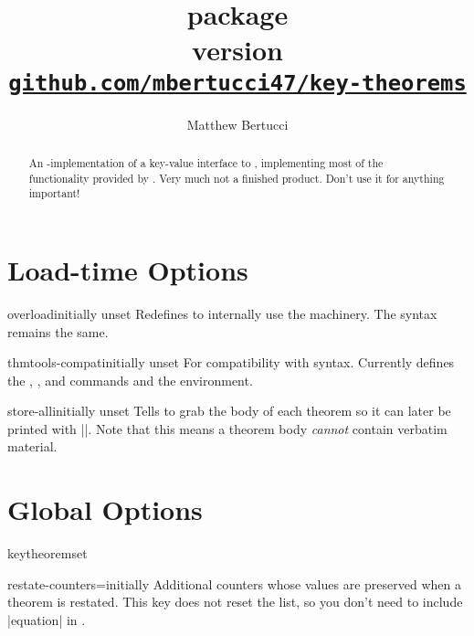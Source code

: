 \documentclass{ltxdoc}
\title{
  \pkg{key-theorems} package \\[1ex]
  \large version \version \\[1ex]
  \href{https://github.com/mbertucci47/key-theorems}
    {\texttt{github.com/mbertucci47/key-theorems}}
  }
\author{Matthew Bertucci}
\newcommand{\ttbraces}[1]{\braces{\texttt{#1}}}
\begin{document}
\maketitle

\begin{abstract}
An -implementation of a key-value interface to , implementing most of the functionality provided by . Very much not a finished product. Don't use it for anything important!
\end{abstract}

\section{Load-time Options}

\begin{docKey}{overload}{}{initially unset}
Redefines  to internally use the  machinery. The syntax remains the same.
\end{docKey}

\begin{docKey}{thmtools-compat}{}{initially unset}
For compatibility with  syntax. Currently defines the , , and  commands and the  environment. 
\end{docKey}

\begin{docKey}{store-all}{}{initially unset}
Tells  to grab the body of each theorem so it can later be
printed with ||. Note that this means a theorem body
\emph{cannot} contain verbatim material.
\end{docKey}
    
\section{Global Options}

\begin{docCommand}{keytheoremset}{}

\end{docCommand}

\begin{docKey}{restate-counters}{=}{initially \ttbraces{equation}}
Additional counters whose values are preserved when a theorem is restated. This key does not reset the list, so you don't need to include |equation| in .
\end{docKey}
\end{document}
